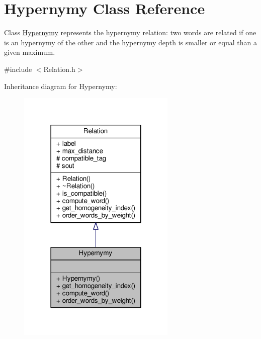 \hypertarget{classHypernymy}{}\section{Hypernymy Class Reference}
\label{classHypernymy}


Class \hyperlink{classHypernymy}{Hypernymy} represents the hypernymy relation\+: two words are related if one is an hypernymy of the other and the hypernymy depth is smaller or equal than a given maximum.  




{\ttfamily \#include $<$Relation.\+h$>$}



Inheritance diagram for Hypernymy\+:
\nopagebreak
\begin{figure}[H]
\begin{center}
\leavevmode
\includegraphics[width=214pt]{classHypernymy__inherit__graph}
\end{center}
\end{figure}


